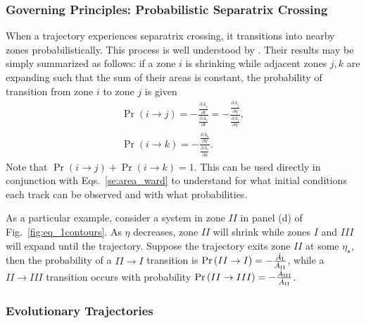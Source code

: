 \documentclass[
        fleqn,
        usenatbib,
        referee,
    ]{mnras}
\newcommand*{\pd}[2]{\frac{\partial#1}{\partial#2}}
\newcommand*{\p}[1]{\left(#1\right)}
\begin{document}
\subsubsection{Governing Principles: Probabilistic Separatrix Crossing}

When a trajectory experiences separatrix crossing, it transitions into nearby
zones probabilistically. This process is well understood by
\citealp{henrard1982,henrard1987}. Their results may be simply summarized as
follows: if a zone $i$ is shrinking while adjacent zones $j, k$ are expanding
such that the sum of their areas is constant, the probability of transition from
zone $i$ to zone $j$ is given
\begin{align}
    \Pr\p{i \to j} = -\frac{\pd{A_j}{t}}{ \pd{A_i}{t}}
        = -\frac{\pd{A_j}{\eta}}{ \pd{A_i}{\eta}},\\
    \Pr\p{i \to k}
        = -\frac{\pd{A_k}{\eta}}{ \pd{A_i}{\eta}}.\label{eq:henrard_hop}
\end{align}
Note that $\Pr \p{i \to j} + \Pr\p{i \to k} = 1$. This can be used directly in
conjunction with Eqs.~\eqref{se:area_ward} to understand for what initial
conditions each track can be observed and with what probabilities.

As a particular example, consider a system in zone $II$ in panel (d) of
Fig.~\ref{fig:eq_1contours}. As $\eta$ decreases, zone $II$ will shrink while
zones $I$ and $III$ will expand until the trajectory. Suppose the trajectory
exits zone $II$ at some $\eta_\star$, then the probability of a $II \to I$
transition is $\Pr\p{II \to I} = -\frac{\dot{A}_{\rm I}}{\dot{A}_{\rm II}}$,
while a $II \to III$ transition occurs with probability $\Pr\p{II \to III} =
-\frac{\dot{A}_{\rm III}}{\dot{A}_{\rm II}}$.

\subsubsection{Evolutionary Trajectories}\label{sss:evol_traj}
\end{document}
